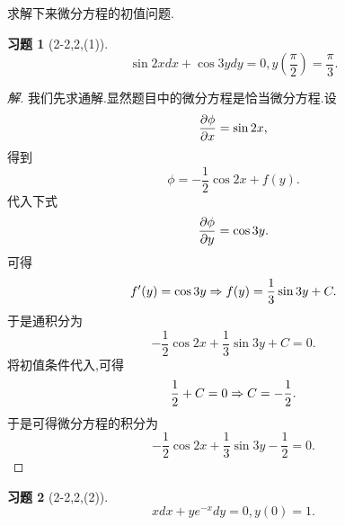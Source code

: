 \documentclass[a4paper, 11pt]{article} %
\newtheorem*{cdtheorem}{习题}
\newenvironment{exercise}
{\begin{mdframed}[backgroundcolor=gray!40,rightline=false,leftline=false,topline=false,bottomline=false]\begin{cdtheorem}}
    {\end{cdtheorem}\end{mdframed}}
\begin{document}
求解下来微分方程的初值问题.
\begin{exercise}[2-2,2,(1)]
$$
\sin 2xdx+\cos 3ydy=0,y(\frac{\pi}{2})=\frac{\pi}{3}.
$$
\end{exercise}
\begin{proof}[解]
我们先求通解.显然题目中的微分方程是恰当微分方程.设
\begin{equation}
  \label{eq:12.35am}
  \frac{\partial\phi}{\partial x}=\sin 2x,
\end{equation}
得到
\begin{equation}
  \label{eq:12.44}
  \phi=-\frac{1}{2}\cos 2x+f(y).
\end{equation}
代入下式
\begin{equation}
  \label{eq:12.43}
  \frac{\partial\phi}{\partial y}=\cos 3y.
\end{equation}
可得
\begin{equation}
  \label{eq:1.00am}
  f'(y)=\cos 3y\Rightarrow  f(y)=\frac{1}{3}\sin 3y+C.
\end{equation}
于是通积分为
\begin{equation}
  \label{eq:1.07am}
  -\frac{1}{2}\cos2x+\frac{1}{3}\sin3y+C=0.
\end{equation}
将初值条件代入,可得
$$
\frac{1}{2}+C=0\Rightarrow C=-\frac{1}{2}.
$$
于是可得微分方程的积分为
$$
-\frac{1}{2}\cos 2x+\frac{1}{3}\sin3y-\frac{1}{2}=0.
$$
\end{proof}
\begin{exercise}[2-2,2,(2)]
$$
xdx+ye^{-x}dy=0,y(0)=1.
$$  
\end{exercise}
\end{document}
